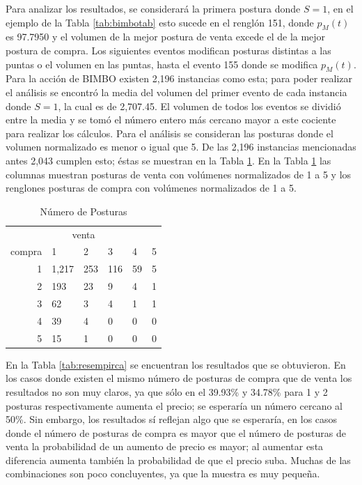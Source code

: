 \documentclass[11pt]{article}
\numberwithin{equation}{section} %
\begin{document}
Para analizar los resultados, se considerará la primera postura donde $S=1$, en el ejemplo de la Tabla \ref{tab:bimbotab} esto sucede en el renglón 151, donde $p_M(t)$ es 97.7950 y el volumen de la mejor postura de venta excede el de la mejor postura de compra. Los siguientes eventos modifican posturas distintas a las puntas o el volumen en las puntas, hasta el evento 155 donde se modifica $p_M(t)$.\\

Para la acción de BIMBO existen 2,196 instancias como esta; para poder realizar el análisis se encontró la media del volumen del primer evento de cada instancia donde $S=1$, la cual es de 2,707.45. El volumen de todos los eventos se dividió entre la media y se tomó el número entero más cercano mayor a este cociente para realizar los cálculos. Para el análisis se consideran las posturas donde el volumen normalizado es menor o igual que 5. De las 2,196 instancias mencionadas antes 2,043 cumplen esto; éstas se muestran en la Tabla \ref{tab:numempirca}. En la Tabla \ref{tab:numempirca} las columnas muestran posturas de venta con volúmenes normalizados de 1 a 5 y los renglones posturas de compra con volúmenes normalizados de 1 a 5.

\begin{table}[htbp]
\centering
\caption{Número de Posturas}
\begin{tabular}{r|p{1.5cm}|p{1.5cm}|p{1.5cm}|p{1.5cm}|p{1.5cm}|}
\multicolumn{6}{c}{venta}\\
\cline{2-6}
compra & 1& 2 & 3 & 4 & 5 \\
\cline{2-6}
1 & 1,217 & 253 & 116 & 59 & 5 \\
2 & 193 & 23 & 9 & 4 & 1 \\
3 & 62 & 3 & 4 & 1 & 1 \\
4 & 39 & 4 & 0 & 0 & 0 \\
5 & 15 & 1 & 0 & 0 & 0 \\
\cline{2-6}
\end{tabular}%
\label{tab:numempirca}%
\end{table}%

En la Tabla \ref{tab:resempirca} se encuentran los resultados que se obtuvieron. En los casos donde existen el mismo número de posturas de compra que de venta los resultados no son muy claros, ya que sólo en el 39.93\% y 34.78\% para 1 y 2 posturas respectivamente aumenta el precio; se esperaría un número cercano al 50\%. Sin embargo, los resultados sí reflejan algo que se esperaría, en los casos donde el número de posturas de compra es mayor que el número de posturas de venta la probabilidad de un aumento de precio es mayor; al aumentar esta diferencia aumenta también la probabilidad de que el precio suba. Muchas de las combinaciones son poco concluyentes, ya que la muestra es muy pequeña.
\end{document}

